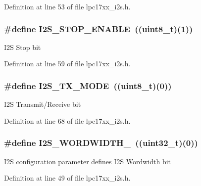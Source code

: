 \-Definition at line 53 of file lpc17xx\-\_\-i2s.\-h.

\hypertarget{group___i2_s___public___macros_gabe1e11f6f4ce8542408e466b3316ca3c}{
\subsubsection[{\-I2\-S\-\_\-\-S\-T\-O\-P\-\_\-\-E\-N\-A\-B\-L\-E}]{\setlength{\rightskip}{0pt plus 5cm}\#define {\bf \-I2\-S\-\_\-\-S\-T\-O\-P\-\_\-\-E\-N\-A\-B\-L\-E}~((uint8\-\_\-t)(1))}}\label{group___i2_s___public___macros_gabe1e11f6f4ce8542408e466b3316ca3c}
\-I2\-S \-Stop bit 

\-Definition at line 59 of file lpc17xx\-\_\-i2s.\-h.

\hypertarget{group___i2_s___public___macros_ga9a69048cf8ff0576f573ce0605a15753}{
\subsubsection[{\-I2\-S\-\_\-\-T\-X\-\_\-\-M\-O\-D\-E}]{\setlength{\rightskip}{0pt plus 5cm}\#define {\bf \-I2\-S\-\_\-\-T\-X\-\_\-\-M\-O\-D\-E}~((uint8\-\_\-t)(0))}}\label{group___i2_s___public___macros_ga9a69048cf8ff0576f573ce0605a15753}
\-I2\-S \-Transmit/\-Receive bit 

\-Definition at line 68 of file lpc17xx\-\_\-i2s.\-h.

\hypertarget{group___i2_s___public___macros_ga17cb1a91d5be4e7afad486ead6d2980d}{
\subsubsection[{\-I2\-S\-\_\-\-W\-O\-R\-D\-W\-I\-D\-T\-H\-\_\-8}]{\setlength{\rightskip}{0pt plus 5cm}\#define {\bf \-I2\-S\-\_\-\-W\-O\-R\-D\-W\-I\-D\-T\-H\-\_}~((uint32\-\_\-t)(0))}}\label{group___i2_s___public___macros_ga17cb1a91d5be4e7afad486ead6d2980d}
\-I2\-S configuration parameter defines \-I2\-S \-Wordwidth bit 

\-Definition at line 49 of file lpc17xx\-\_\-i2s.\-h.

